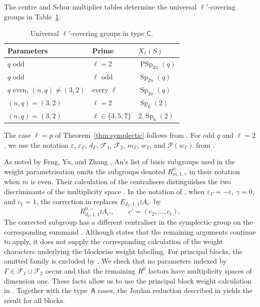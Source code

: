 \documentclass[10pt]{amsart}
\theoremstyle{definition}
\DeclareMathOperator{\Sp}{Sp}
\DeclareMathOperator{\PSp}{PSp}
\numberwithin{equation}{section}
\numberwithin{table}{section}
\begin{document}
The centre and Schur multiplier tables
\cite[Tables~24.2--24.3 and Remark~24.19]{MalleTesterman2011} determine the universal
$\ell'$-covering groups in Table~\ref{tab:typec-carriers}.

\begin{table}[ht]
\centering
\caption{Universal $\ell'$-covering groups in type $\mathsf C$.}
\label{tab:typec-carriers}
\begin{tabular}{@{}lll@{}}
\toprule
Parameters & Prime & $X_\ell(S)$ \\
\midrule
$q$ odd & $\ell=2$ & $\PSp_{2n}(q)$ \\
$q$ odd & $\ell$ odd & $\Sp_{2n}(q)$ \\
$q$ even, $(n,q)\neq(3,2)$ & every $\ell$ & $\Sp_{2n}(q)$ \\
$(n,q)=(3,2)$ & $\ell=2$ & $\Sp_6(2)$ \\
$(n,q)=(3,2)$ & $\ell\in\{3,5,7\}$ & $2.\Sp_6(2)$ \\
\bottomrule
\end{tabular}
\end{table}

The case $\ell=p$ of Theorem~\ref{thm:symplectic} follows from
\cite[Theorem~C]{Spath2013}.  For odd $q$ and $\ell=2$, we use the notation
$\varepsilon$, $\varepsilon_\Gamma$, $d_\Gamma$, $\mathcal F_1$,
$\mathcal F_2$, $m_\Gamma$, $w_\Gamma$, and $\mathcal P(w_\Gamma)$ from
\cite[Sections~2 and~5]{FengMalle2022}.

As noted by Feng, Yu, and Zhang \cite{FengYuZhang2024}, An's list of basic
subgroups used in the weight parametrisation \cite[p.~190]{An1993} omits
the subgroups denoted $R^0_{m,1,\gamma}$ in their notation when $m$ is even.
Their calculation of the centralisers distinguishes the two discriminants
of the multiplicity space \cite[proof of Proposition~3.48]{FengYuZhang2024}.
In the notation of \cite[p.~11]{FengMalle2022}, when
$\varepsilon_\Gamma=-\varepsilon$, $\gamma=0$, and $c_1=1$, the correction
in \cite[Remark~3.49]{FengYuZhang2024} replaces
$E_{d_\Gamma,1,1}\wr A_{c'}$ by
\[
 R^{0,-}_{d_\Gamma,1,1}\wr A_{c'},
 \qquad c'=(c_2,\ldots,c_t).
\]
The corrected subgroup has a different centraliser in the symplectic group
on the corresponding summand
\cite[proof of Proposition~3.48]{FengYuZhang2024}.  Although
\cite[Remark~3.49]{FengYuZhang2024} states that the remaining arguments
continue to apply, it does not supply
the corresponding calculation of the weight characters underlying the blockwise
weight labelling.  For principal blocks, the omitted family is excluded by
\cite[Remark~3.50]{FengYuZhang2024}. We check that no parameters indexed
by $\Gamma\in\mathcal F_1\cup\mathcal F_2$ occur and that the remaining
$R^0$ factors have multiplicity spaces of dimension one. These facts allow
us to use the principal block weight calculation in
\cite[Section~5]{FengMalle2022}. Together with the type~$\mathsf A$
cases, the Jordan reduction described in
\cite[Remark~5.8]{FengLiZhang2022Jordan} yields the result for all blocks.
\end{document}
